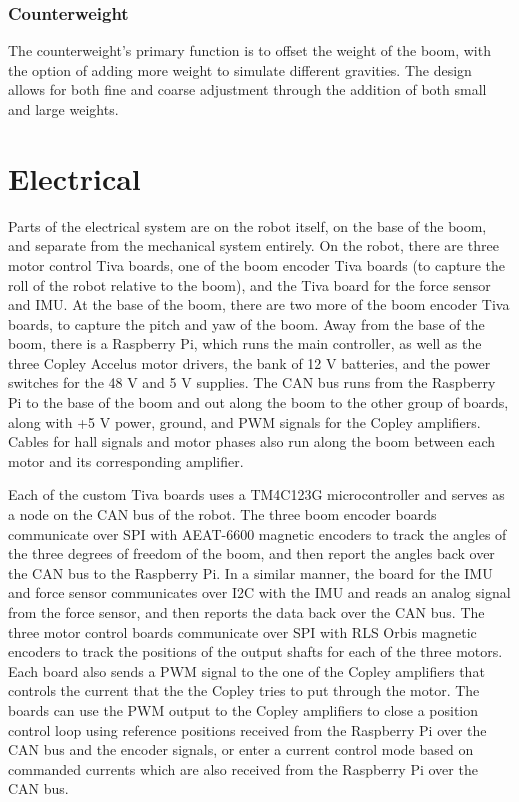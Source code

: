 \documentclass{report}
\begin{document}
\subsubsection[Counterweight]{Counterweight}
The counterweight's primary function is to offset the weight of the boom, with the option of adding more weight to simulate different gravities. The design allows for both fine and coarse adjustment through the addition of both small and large weights.

\section[Electrical]{Electrical}
Parts of the electrical system are on the robot itself, on the base of the boom, and separate from the mechanical system entirely. On the robot, there are three motor control Tiva boards, one of the boom encoder Tiva boards (to capture the roll of the robot relative to the boom), and the Tiva board for the force sensor and IMU. At the base of the boom, there are two more of the boom encoder Tiva boards, to capture the pitch and yaw of the boom. Away from the base of the boom, there is a Raspberry Pi, which runs the main controller, as well as the three Copley Accelus motor drivers, the bank of 12 V batteries, and the power switches for the 48 V and 5 V supplies. The CAN bus runs from the Raspberry Pi to the base of the boom and out along the boom to the other group of boards, along with +5 V power, ground, and PWM signals for the Copley amplifiers. Cables for hall signals and motor phases also run along the boom between each motor and its corresponding amplifier.

Each of the custom Tiva boards uses a TM4C123G microcontroller and serves as a node on the CAN bus of the robot. The three boom encoder boards communicate over SPI with AEAT-6600 magnetic encoders to track the angles of the three degrees of freedom of the boom, and then report the angles back over the CAN bus to the Raspberry Pi. In a similar manner, the board for the IMU and force sensor communicates over I2C with the IMU and reads an analog signal from the force sensor, and then reports the data back over the CAN bus. The three motor control boards communicate over SPI with RLS Orbis magnetic encoders to track the positions of the output shafts for each of the three motors. Each board also sends a PWM signal to the one of the Copley amplifiers that controls the current that the the Copley tries to put through the motor. The boards can use the PWM output to the Copley amplifiers to close a position control loop using reference positions received from the Raspberry Pi over the CAN bus and the encoder signals, or enter a current control mode based on commanded currents which are also received from the Raspberry Pi over the CAN bus. 
\end{document}
